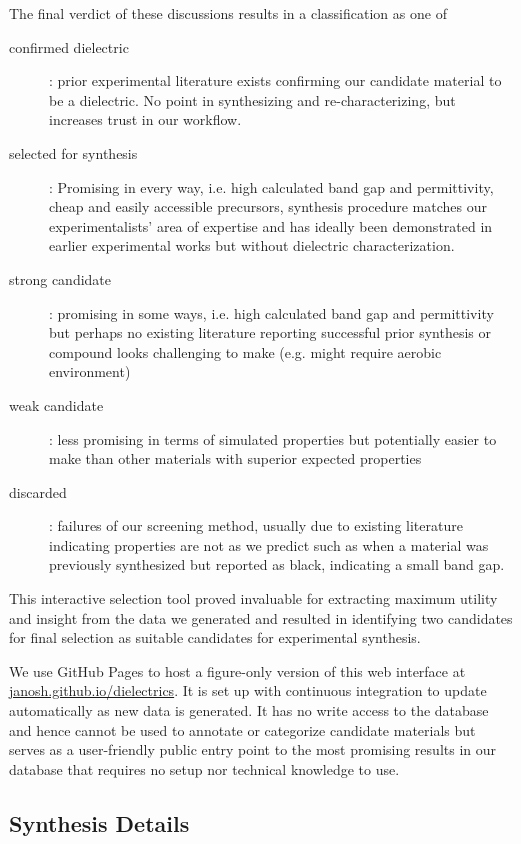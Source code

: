 \documentclass{article}
\begin{document}
The final verdict of these discussions results in a classification as one of
\begin{description}
    \item[confirmed dielectric]: prior experimental literature exists confirming our candidate material to be a dielectric. No point in synthesizing and re-characterizing, but increases trust in our workflow.
    \item[selected for synthesis]: Promising in every way, i.e. high calculated band gap and permittivity, cheap and easily accessible precursors, synthesis procedure matches our experimentalists' area of expertise and has ideally been demonstrated in earlier experimental works but without dielectric characterization.
    \item[strong candidate]: promising in some ways, i.e. high calculated band gap and permittivity but perhaps no existing literature reporting successful prior synthesis or compound looks challenging to make (e.g. might require aerobic environment)
    \item[weak candidate]: less promising in terms of simulated properties but potentially easier to make than other materials with superior expected properties
    \item[discarded]: failures of our screening method, usually due to existing literature indicating properties are not as we predict such as when a material was previously synthesized but reported as black, indicating a small band gap.
\end{description}

This interactive selection tool proved invaluable for extracting maximum utility and insight from the data we generated and resulted in identifying two candidates for final selection as suitable candidates for experimental synthesis.

We use GitHub Pages to host a figure-only version of this web interface at \href{https://janosh.github.io/dielectrics}{janosh.github.io/dielectrics}. It is set up with continuous integration to update automatically as new data is generated. It has no write access to the database and hence cannot be used to annotate or categorize candidate materials but serves as a user-friendly public entry point to the most promising results in our database that requires no setup nor technical knowledge to use.

\subsection{Synthesis Details}
\label{sec:synthesis-details}
\end{document}
